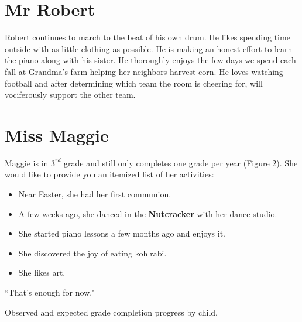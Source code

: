 \documentclass[letterpaper,11pt]{article}
\makeatletter
\newenvironment{figurehere}
  {\def\@captype{figure}}
  {}
\makeatother
\begin{document}
\begin{multicols}{2}
\section{Mr Robert}

Robert continues to march to the beat of his own drum. He likes spending time
outside with as little clothing as possible.  He is making an honest effort to
learn the piano along with his sister.  He thoroughly enjoys the few days
we spend each fall at Grandma's farm helping her neighbors harvest corn. He
loves watching football and after determining which team the room is cheering for,
will vociferously support the other team.



\section{Miss Maggie}

Maggie is in ${3}^{rd}$ grade and still only completes one grade per year
(Figure 2). She would
like to provide you an itemized list of her activities:
\begin{itemize}
\item Near Easter, she had her first communion.
\item A few weeks ago, she danced in the \textbf{Nutcracker} with her dance studio.
\item She started piano lessons a few months ago and enjoys it.
\item She discovered the joy of eating kohlrabi.
\item She likes art.
\end{itemize}
``That's enough for now."

\begin{figurehere}
    \centering   
    \caption{Observed and expected grade completion progress by child.}
\end{figurehere}



\end{multicols}
\end{document}
